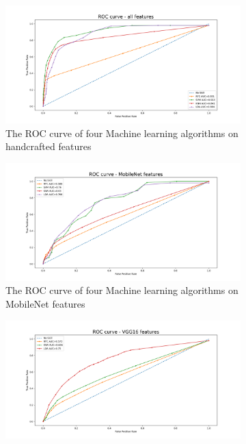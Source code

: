 \begin{figure}
     \centering
     \begin{subfigure}[b]{0.45\textwidth}
         \centering
         \includegraphics[width=1\textwidth]{manuscript/src/figures/project/roc_curve_all.png}
         \caption{The ROC curve of four Machine learning algorithms on handcrafted features}
         \label{fig:ROC_all}
     \end{subfigure}
     \hfill
     \begin{subfigure}[b]{0.45\textwidth}
         \centering
         \includegraphics[width=\textwidth]{manuscript/src/figures/project/roc_curve_MobileNet.png}
         \caption{The ROC curve of four Machine learning algorithms on MobileNet features}
         \label{fig:ROC_Mob}
     \end{subfigure}
     \vfill
     \begin{subfigure}[b]{0.45\textwidth}
         \centering
         \includegraphics[width=\textwidth]{manuscript/src/figures/project/roc_curve_vgg.png}

\end{subfigure}
\end{figure}
